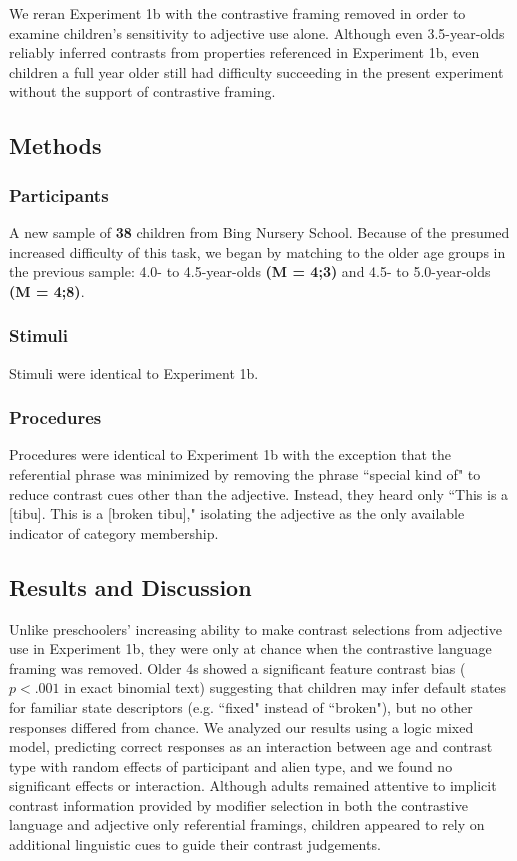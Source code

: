 \documentclass[10pt,letterpaper]{article}
\begin{document}
We reran Experiment 1b with the contrastive framing removed in order to examine children's sensitivity to adjective use alone. Although even 3.5-year-olds reliably inferred contrasts from properties referenced in Experiment 1b, even children a full year older still had difficulty succeeding in the present experiment without the support of contrastive framing.  

\subsection{Methods}

\subsubsection{Participants}

A new sample of \textbf{38} children from Bing Nursery School.  Because of the presumed increased difficulty of this task, we began by matching to the older age groups in the previous sample: 4.0- to 4.5-year-olds \textbf{(M = 4;3)} and 4.5- to 5.0-year-olds \textbf{(M = 4;8)}.

\subsubsection{Stimuli}

Stimuli were identical to Experiment 1b. 

\subsubsection{Procedures}

Procedures were identical to Experiment 1b with the exception that the referential phrase was minimized by removing the phrase ``special kind of" to reduce contrast cues other than the adjective.  Instead, they heard only ``This is a [tibu]. This is a [broken tibu]," isolating the adjective as the only available indicator of category membership.

\subsection{Results and Discussion}

Unlike preschoolers' increasing ability to make contrast selections from adjective use in Experiment 1b, they were only at chance when the contrastive language framing was removed.  Older 4s showed a significant feature contrast bias ($p < .001$ in exact binomial text) suggesting that children may infer default states for familiar state descriptors (e.g. ``fixed" instead of ``broken"), but no other responses differed from chance.  We analyzed our results using a logic mixed model, predicting correct responses as an interaction between age and contrast type with random effects of participant and alien type, and we found no significant effects or interaction.  Although adults remained attentive to implicit contrast information provided by modifier selection in both the contrastive language and adjective only referential framings, children appeared to rely on additional linguistic cues to guide their contrast judgements.  
\end{document}
